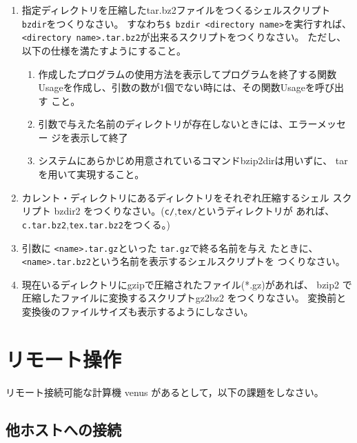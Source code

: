 \documentclass[11pt, twocolumn, ]{jsarticle}
\begin{document}
\begin{enumerate}
\item
  指定ディレクトリを圧縮したtar.bz2ファイルをつくるシェルスクリプト
  \passthrough{\lstinline!bzdir!}をつくりなさい。
  すなわち\passthrough{\lstinline!$ bzdir <directory name>!}を実行すれば、
  \passthrough{\lstinline!<directory name>.tar.bz2!}が出来るスクリプトをつくりなさい。
  ただし、以下の仕様を満たすようにすること。

  \begin{enumerate}
  \item
    作成したプログラムの使用方法を表示してプログラムを終了する関数
    Usageを作成し、引数の数が1個でない時には、その関数Usageを呼び出す
    こと。
  \item
    引数で与えた名前のディレクトリが存在しないときには、エラーメッセー
    ジを表示して終了
  \item
    システムにあらかじめ用意されているコマンドbzip2dirは用いずに、
    tarを用いて実現すること。
  \end{enumerate}
\item
  カレント・ディレクトリにあるディレクトリをそれぞれ圧縮するシェル
  スクリプト bzdir2
  をつくりなさい。(\passthrough{\lstinline!c/!},\passthrough{\lstinline!tex/!}というディレクトリが
  あれば、\passthrough{\lstinline!c.tar.bz2!},\passthrough{\lstinline!tex.tar.bz2!}をつくる。)
\item
  引数に \passthrough{\lstinline!<name>.tar.gz!}といった
  \passthrough{\lstinline!tar.gz!}で終る名前を与え
  たときに、\passthrough{\lstinline!<name>.tar.bz2!}という名前を表示するシェルスクリプトを
  つくりなさい。
\item
  現在いるディレクトリにgzipで圧縮されたファイル(*.gz)があれば、 bzip2
  で圧縮したファイルに変換するスクリプトgz2bz2 をつくりなさい。
  変換前と変換後のファイルサイズも表示するようにしなさい。
\end{enumerate}

\hypertarget{ux30eaux30e2ux30fcux30c8ux64cdux4f5c}{%
\section{リモート操作}\label{ux30eaux30e2ux30fcux30c8ux64cdux4f5c}}

リモート接続可能な計算機 venus があるとして，以下の課題をしなさい。

\hypertarget{ux4ed6ux30dbux30b9ux30c8ux3078ux306eux63a5ux7d9a}{%
\subsection{他ホストへの接続}\label{ux4ed6ux30dbux30b9ux30c8ux3078ux306eux63a5ux7d9a}}
\end{document}
